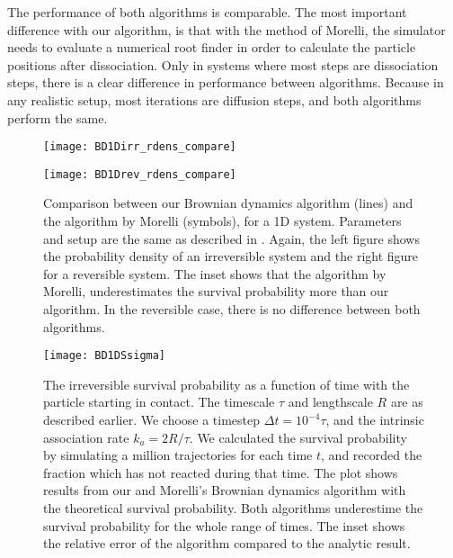 The performance of both algorithms is comparable. The most important difference with our algorithm, is that with the method of Morelli, the simulator needs to evaluate a numerical root finder in order to calculate the particle positions after dissociation. Only in systems where most steps are dissociation steps, there is a clear difference in performance between algorithms. Because in any realistic setup, most iterations are diffusion steps, and both algorithms perform the same.

\begin{figure}[hb]
\begin{minipage}[ht]{.5\linewidth}
\centering
\texttt{[image: BD1Dirr\_rdens\_compare]}
\end{minipage}
\begin{minipage}[ht]{.5\linewidth}
\centering
\texttt{[image: BD1Drev\_rdens\_compare]}
\end{minipage}
\caption{ Comparison between our Brownian dynamics algorithm (lines) and the algorithm by Morelli \cite{Morelli2008a} (symbols), for a 1D system. Parameters and setup are the same as described in . Again, the left figure shows the probability density of an irreversible system and the right figure for a reversible system. The inset shows that the algorithm by Morelli, underestimates the survival probability more than our algorithm. In the reversible case, there is no difference between both algorithms.}
\end{figure}

\begin{figure}[hb]
\centering
\texttt{[image: BD1DSsigma]}
\caption{ The irreversible survival probability as a function of time with the particle starting in contact. The timescale $\tau$ and lengthscale $R$ are as described earlier. We choose a timestep $\Delta t = 10^{-4} \tau$, and the intrinsic association rate $k_a=2 R/\tau$. We calculated the survival probability by simulating a million trajectories for each time $t$, and recorded the fraction which has not reacted during that time. The plot shows results from our and Morelli's Brownian dynamics algorithm with the theoretical survival probability. Both algorithms underestime the survival probability for the whole range of times. The inset shows the relative error of the algorithm compared to the analytic result.}
\end{figure}